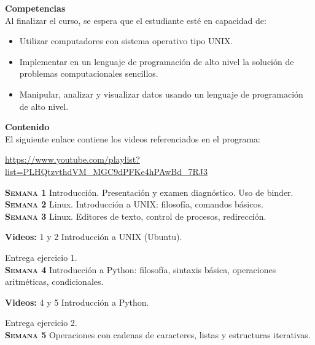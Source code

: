 \documentclass[letterpaper,10pt,onecolumn]{article}
\begin{document}
\noindent\textbf{\large {} \quad Competencias}\\[-0.2cm]

\noindent\normalsize Al finalizar el curso, se espera que el estudiante esté en capacidad de:

\begin{itemize}
	\item Utilizar computadores con sistema operativo tipo UNIX.\\[-0.6cm]
	\item Implementar en un lenguaje de programación de alto nivel la solución de problemas computacionales sencillos.\\[-0.6cm]
	\item Manipular, analizar y visualizar datos usando un lenguaje de programación de alto nivel.\\[-0.2cm]
\end{itemize}

\noindent\textbf{\large {} \quad Contenido}\\[-0.2cm]

El siguiente enlace contiene los videos referenciados en el programa:

\url{https://www.youtube.com/playlist?list=PLHQtzvthdVM_MGC9dPFKe4hPAwBd_7RJ3}

\noindent\normalsize \textbf{\textsc{Semana 1}} Introducción.
Presentación y examen diagnóstico. Uso de binder.
\\[-0.3cm] 

\noindent\textbf{\textsc{Semana 2}} Linux.
Introducción a UNIX: filosofía, comandos básicos. 
\\[-0.3cm] 

\noindent\textbf{\textsc{Semana 3}}  Linux. 
Editores de texto, control de procesos, redirección.

\textbf{Videos:} 1 y 2 Introducci\'on a UNIX (Ubuntu).

Entrega ejercicio 1.
\\[-0.3cm]  

\noindent\textbf{\textsc{Semana 4}} Introducción a Python: filosofía,
sintaxis básica, operaciones aritméticas, condicionales.

\textbf{Videos:} 4 y 5 Introducci\'on a Python.

Entrega ejercicio 2.
\\[-0.3cm]   

\noindent\textbf{\textsc{Semana 5}} Operaciones con cadenas de
caracteres, listas y estructuras iterativas.
\end{document}
